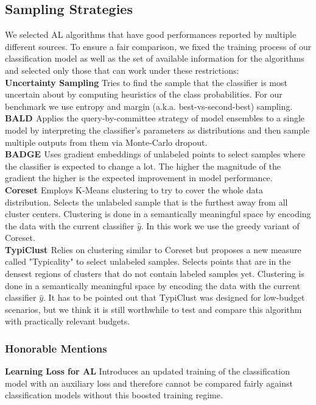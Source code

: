\documentclass[]{article}
\begin{document}
\subsection{Sampling Strategies}\label{sec:sampling_strategies}
We selected AL algorithms that have good performances reported by multiple different sources.
To ensure a fair comparison, we fixed the training process of our classification model as well as the set of available information for the algorithms and selected only those that can work under these restrictions:\\
\textbf{Uncertainty Sampling} 
Tries to find the sample that the classifier is most uncertain about by computing heuristics of the class probabilities. For our benchmark we use entropy and margin (a.k.a. best-vs-second-best) sampling.\\
\textbf{BALD \cite{kirsch2019batchbald}}
Applies the query-by-committee strategy of model ensembles to a single model by interpreting the classifier's parameters as distributions and then sample multiple outputs from them via Monte-Carlo dropout.\\
\textbf{BADGE \cite{ashdeep}} Uses gradient embeddings of unlabeled points to select samples where the classifier is expected to change a lot. The higher the magnitude of the gradient the higher is the expected improvement in model performance.\\
\textbf{Coreset \cite{sener2017active}}
Employs K-Means clustering to try to cover the whole data distribution.
Selects the unlabeled sample that is the furthest away from all cluster centers.
Clustering is done in a semantically meaningful space by encoding the data with the current classifier $\hat y$.
In this work we use the greedy variant of Coreset.\\
\textbf{TypiClust \cite{hacohen2022active}}
Relies on clustering similar to Coreset but proposes a new measure called "Typicality" to select unlabeled samples.
Selects points that are in the densest regions of clusters that do not contain labeled samples yet.
Clustering is done in a semantically meaningful space by encoding the data with the current classifier $\hat y$.
It has to be pointed out that TypiClust was designed for low-budget scenarios, but we think it is still worthwhile to test and compare this algorithm with practically relevant budgets.
%
\subsubsection*{Honorable Mentions}
\textbf{Learning Loss for AL}
Introduces an updated training of the classification model with an auxiliary loss and therefore cannot be compared fairly against classification models without this boosted training regime.
\end{document}
